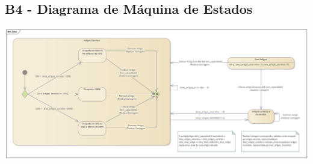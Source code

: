 \documentclass{article}
\begin{document}
\pagebreak

\begin{landscape}
	\section*{B4 - Diagrama de Máquina de Estados}
	\vspace*{\fill}
	\begin{center}
		\includegraphics[width=1.5\textheight,height=\textwidth,keepaspectratio]{B4}
	\end{center}
	\vspace*{\fill}
\end{landscape}
\end{document}
